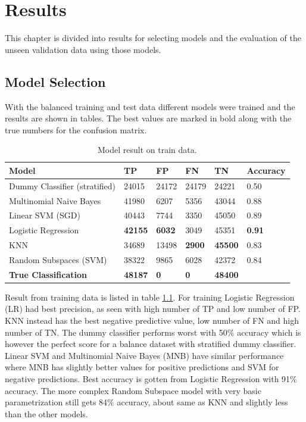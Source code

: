 \chapter{Results}
\label{cha:results}

This chapter is divided into results for selecting models and the evaluation of the unseen validation data using those models. 


\section{Model Selection}
\label{sec:model-selection-result}

With the balanced training and test data different models were trained and the results are shown in tables. 
The best values are marked in bold along with the true numbers for the confusion matrix. 


\begin{table}[H]
    \centering
    \caption{Model result on train data.}
    \label{tab:train-table}
    \begin{tabular}{@{}llllll@{}}
    \toprule
    Model                         & TP             & FP            & FN            & TN             & Accuracy      \\ \midrule
    Dummy Classifier (stratified) & 24015          & 24172         & 24179         & 24221          & 0.50          \\
    Multinomial Naive Bayes       & 41980          & 6207          & 5356          & 43044          & 0.88          \\
    Linear SVM (SGD)              & 40443          & 7744          & 3350          & 45050          & 0.89          \\
    Logistic Regression           & \textbf{42155} & \textbf{6032} & 3049          & 45351          & \textbf{0.91} \\
    KNN                           & 34689          & 13498         & \textbf{2900} & \textbf{45500} & 0.83          \\
    Random Subspaces (SVM)        & 38322          & 9865          & 6028          & 42372          & 0.84          \\ \midrule
    \textbf{True Classification}  & \textbf{48187} & \textbf{0}    & \textbf{0}    & \textbf{48400} & \textbf{}    
    \end{tabular}
\end{table}


Result from training data is listed in table \ref{tab:train-table}. 
For training Logistic Regression (LR) had best precision, as seen with high number of TP and low number of FP. 
KNN instead has the best negative predictive value, low number of FN and high number of TN. 
The dummy classifier performs worst with 50\% accuracy which is however the perfect score for a balance dataset with stratified dummy classifier. 
Linear SVM and Multinomial Naive Bayes (MNB) have similar performance where MNB has slightly better values for positive predictions and SVM for negative predictions. 
Best accuracy is gotten from Logistic Regression with 91\% accuracy. 
The more complex Random Subspace model with very basic parametrization still gets 84\% accuracy, about same as KNN and slightly less than the other models.


